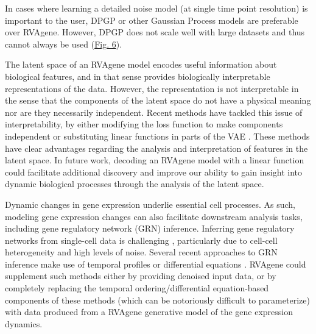 {In cases where learning a detailed noise model (at single time point resolution) is important to the user, DPGP or other Gaussian Process models are preferable over RVAgene.}
However, DPGP does not scale well with large datasets and thus cannot always be used (\hyperref[fig:fig7]{Fig. 6}).
\par 
The latent space of an RVAgene model encodes useful information about biological features, and in that sense provides biologically interpretable representations of the data. However, the representation is not interpretable in the sense that the components of the latent space do not have a physical meaning nor are they necessarily independent. Recent methods have tackled this issue of interpretability, by either modifying the loss function to make components independent \citep{higgins2016beta} or substituting linear functions in parts of the VAE \citep{svensson2020interpretable, ainsworth2018oi}. These methods have clear advantages regarding the analysis and interpretation of features in the latent space. In future work, decoding an RVAgene model with a linear function \citep{svensson2020interpretable} could facilitate additional discovery and improve our ability to gain insight into dynamic biological processes through the analysis of the latent space.
\par 
Dynamic changes in gene expression underlie essential cell processes. As such, modeling gene expression changes can also facilitate downstream analysis tasks, including gene regulatory network (GRN) inference. Inferring gene regulatory networks from single-cell data is challenging \citep{chen18_evaluating}, particularly due to cell-cell heterogeneity and high levels of noise. Several recent approaches to GRN inference make use of temporal profiles \citep{deshpande19_network, kim20_tenet}  
or differential equations \citep{ma20_inference, aubin-frankowski20_gene, matsumoto17_scode}. RVAgene could supplement such methods either by providing denoised input data, or by completely replacing the temporal ordering/differential equation-based components of these methods (which can be notoriously difficult to parameterize) with data produced from a RVAgene generative model of the gene expression dynamics.
\par 
